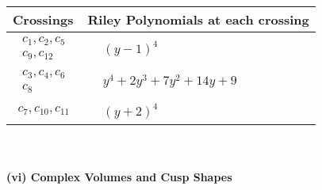 \documentclass[1p]{elsarticle_modified}
\theoremstyle{definition}
\begin{document}
\begin{tabular}{m{50pt}|m{274pt}}
Crossings & \hspace{64pt}Riley Polynomials at each crossing \\
\hline $$\begin{aligned}c_{1},c_{2},c_{5}\\c_{9},c_{12}\end{aligned}$$&$\begin{aligned}
&(y-1)^4
\end{aligned}$\\
\hline $$\begin{aligned}c_{3},c_{4},c_{6}\\c_{8}\end{aligned}$$&$\begin{aligned}
&y^4+2 y^3+7 y^2+14 y+9
\end{aligned}$\\
\hline $$\begin{aligned}c_{7},c_{10},c_{11}\end{aligned}$$&$\begin{aligned}
&(y+2)^4
\end{aligned}$\\
\hline
\end{tabular}\\~\\
\newpage\flushleft \textbf{(vi) Complex Volumes and Cusp Shapes}
\end{document}
